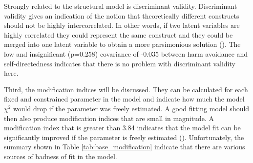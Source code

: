 \documentclass[11pt]{article}
\begin{document}
Strongly related to the structural model is discriminant validity.
Discriminant validity gives an indication of the notion that theoretically different constructs should not be highly intercorrelated.
In other words, if two latent variables are highly correlated they could represent the same construct and they could be merged into one latent variable to obtain a more parsimonious solution (\cite{brown2015}).
The low and insignificant (p=0.258) covariance of -0.035 between harm avoidance and self-directedness indicates that there is no problem with discriminant validity here.

\begin{table}[h!]
\captionsetup{singlelinecheck=off}
\caption{Structural model}
\label{tab:base_structural}
\end{table}

Third, the modification indices will be discussed.
They can be calculated for each fixed and constrained parameter in the model and indicate how much the model $\chi^2$ would drop if the parameter was freely estimated.
A good fitting model should then also produce modification indices that are small in magnitude.
A modification index that is greater than 3.84 indicates that the model fit can be significantly improved if the parameter is freely estimated (\cite{brown2015}).
Unfortunately, the summary shown in Table \ref{tab:base_modification} indicate that there are various sources of badness of fit in the model.
\end{document}
